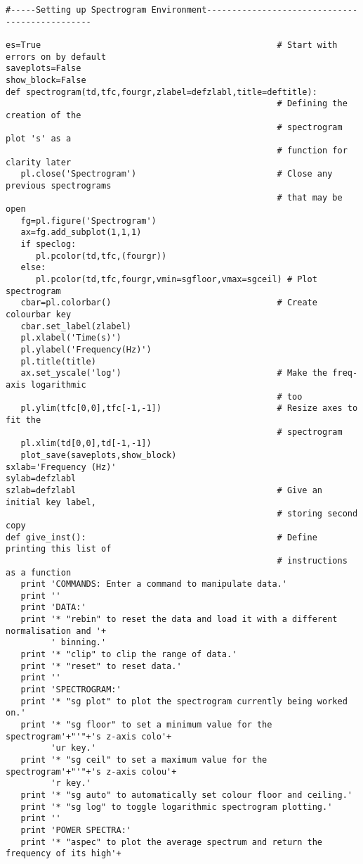 \begin{verbatim}
#-----Setting up Spectrogram Environment-----------------------------------------------

es=True                                               # Start with errors on by default
saveplots=False
show_block=False
def spectrogram(td,tfc,fourgr,zlabel=defzlabl,title=deftitle):
                                                      # Defining the creation of the
                                                      # spectrogram plot 's' as a
                                                      # function for clarity later
   pl.close('Spectrogram')                            # Close any previous spectrograms
                                                      # that may be open
   fg=pl.figure('Spectrogram')
   ax=fg.add_subplot(1,1,1)
   if speclog:
      pl.pcolor(td,tfc,(fourgr))
   else:
      pl.pcolor(td,tfc,fourgr,vmin=sgfloor,vmax=sgceil) # Plot spectrogram
   cbar=pl.colorbar()                                 # Create colourbar key
   cbar.set_label(zlabel)
   pl.xlabel('Time(s)')
   pl.ylabel('Frequency(Hz)')
   pl.title(title)
   ax.set_yscale('log')                               # Make the freq-axis logarithmic
                                                      # too
   pl.ylim(tfc[0,0],tfc[-1,-1])                       # Resize axes to fit the
                                                      # spectrogram
   pl.xlim(td[0,0],td[-1,-1])
   plot_save(saveplots,show_block)
sxlab='Frequency (Hz)'
sylab=defzlabl
szlab=defzlabl                                        # Give an initial key label,
                                                      # storing second copy
def give_inst():                                      # Define printing this list of
                                                      # instructions as a function
   print 'COMMANDS: Enter a command to manipulate data.'
   print ''
   print 'DATA:'
   print '* "rebin" to reset the data and load it with a different normalisation and '+
         ' binning.'
   print '* "clip" to clip the range of data.'
   print '* "reset" to reset data.'
   print ''
   print 'SPECTROGRAM:'
   print '* "sg plot" to plot the spectrogram currently being worked on.'
   print '* "sg floor" to set a minimum value for the spectrogram'+"'"+'s z-axis colo'+
         'ur key.'
   print '* "sg ceil" to set a maximum value for the spectrogram'+"'"+'s z-axis colou'+
         'r key.'
   print '* "sg auto" to automatically set colour floor and ceiling.'
   print '* "sg log" to toggle logarithmic spectrogram plotting.'
   print ''
   print 'POWER SPECTRA:'
   print '* "aspec" to plot the average spectrum and return the frequency of its high'+

\end{verbatim}
